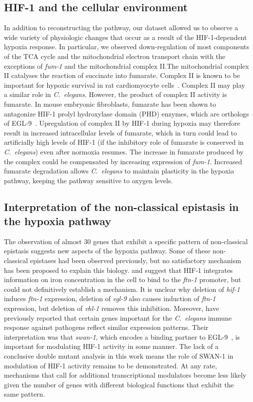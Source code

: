 \documentclass[9pt,twocolumn,twoside]{pnas-new}
\newcommand{\cel}{\emph{C.~elegans}}
\newcommand{\gene}[1]{\emph{#1}}
\newcommand{\ftna}{\emph{ftn-1}}
\newcommand{\eglp}{EGL-9}
\newcommand{\hifp}{HIF-1}
\begin{document}
\subsection*{\hifp{} and the cellular environment}

In addition to reconstructing the pathway, our dataset allowed us
to observe a wide variety of physiologic changes that occur as a result of the
\hifp{}-dependent hypoxia response. In particular, we observed down-regulation of most
components of the TCA cycle and the mitochondrial electron transport chain with
the exceptions of \gene{fum-1} and the mitochondrial complex II.\@ The mitochondrial
complex II catalyses the reaction of succinate into fumarate. Complex II is known
to be important for hypoxic survival in rat cardiomyocyte cells~\cite{Pfleger2015}.
Complex II may play a similar role in \cel{}. However, the product of complex II
activity is fumarate. In mouse embryonic fibroblasts, fumarate has been
shown to antagonize \hifp{} prolyl hydroxylase domain (PHD) enzymes, which are
orthologs of \eglp{}~\cite{Sudarshan2009}. Upregulation of complex II by \hifp{}
during hypoxia may therefore result in increased intracellular levels of fumarate,
which in turn could lead to artificially high levels of \hifp{} (if the inhibitory
role of fumarate is conserved in \cel{}) even after normoxia resumes. The increase
in fumarate produced by the complex could be compensated by increasing expression of
\gene{fum-1}. Increased fumarate degradation allows \cel{} to maintain plasticity
in the hypoxia pathway, keeping the pathway sensitive to oxygen levels.

\subsection*{Interpretation of the non-classical epistasis in the hypoxia pathway}
The observation of almost 30 genes that exhibit a specific pattern of non-classical
epistasis suggests new aspects of the hypoxia pathway. Some of these non-classical
epistases had been observed previously, but no satisfactory mechanism has been
proposed to explain this biology. \citep{Romney2011} and \citep{Ackerman2012}
suggest that \hifp{} integrates information on iron concentration in the
cell to bind to the \ftna{} promoter, but could not definitively establish
a mechanism.
It is unclear why deletion of \gene{hif-1} induces \ftna{}
expression, deletion of \gene{egl-9} also causes induction of \ftna{} expression,
but deletion of \gene{vhl-1} removes this inhibition. Moreover, \citep{Luhachack2012}
have previously reported that certain genes important for the \cel{} immune response
against pathogens reflect similar expression patterns. Their interpretation
was that \gene{swan-1}, which encodes a binding partner to \eglp{}~\cite{Shao2010},
is important for modulating \hifp{} activity in some manner. The lack of a
conclusive double mutant analysis in this work means the role of SWAN-1 in
modulation of \hifp{} activity remains to be demonstrated. At any rate, mechanisms
that call for additional transcriptional modulators become less likely given the
number of genes with different biological functions that exhibit the same pattern.
\end{document}
